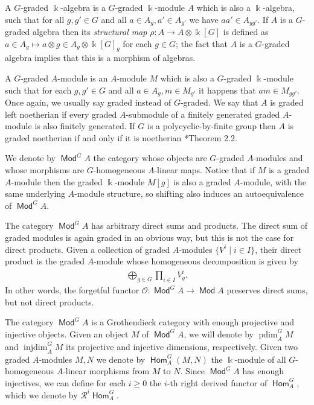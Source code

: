 \documentclass[11pt,fleqn]{article}
\newcommand\ot{\otimes}
\renewcommand\to{\longrightarrow}
\renewcommand\k{\Bbbk}
\renewcommand\O{\mathcal O}
\newcommand\R{\mathcal R}
\DeclareMathOperator\Mod{\mathsf{Mod}}
\DeclareMathOperator\Hom{\mathsf{Hom}}
\DeclareMathOperator\injdim{injdim}
\DeclareMathOperator\projdim{pdim}
\begin{document}
A $G$-graded $\k$-algebra is a $G$-graded $\k$-module $A$ which is also a 
$\k$-algebra, such that for all $g,g' \in G$ and all $a \in A_g, a' \in A_{g'}$
we have $aa' \in A_{gg'}$. If $A$ is a $G$-graded algebra then its
\emph{structural map} $\rho: A \to A \ot \k[G]$ is defined as $a \in A_g 
\mapsto a \ot g \in A_g \ot \k[G]_g$ for each $g \in G$; the fact that $A$ is 
a $G$-graded algebra implies that this is a morphism of algebras.

A $G$-graded $A$-module is an $A$-module $M$ which is also a $G$-graded 
$\k$-module such that for each $g,g' \in G$ and all $a \in A_g, 
m \in M_{g'}$ it happens that $am \in M_{gg'}$. Once again, we usually say 
graded instead of $G$-graded. We say that $A$ is graded left noetherian if
every graded $A$-submodule of a finitely generated graded $A$-module is
also finitely generated. If $G$ is a polycyclic-by-finite group then $A$ is
graded noetherian if and only if it is noetherian 
\cite{CQ-polycyclic}*{Theorem 2.2}.

We denote by $\Mod^G A$ the category whose objects are $G$-graded
$A$-modules and whose morphisms are $G$-homogeneous $A$-linear maps. 
Notice that if $M$ is a graded $A$-module then the graded $\k$-module $M[g]$
is also a graded $A$-module, with the same underlying $A$-module structure,
so shifting also induces an autoequivalence of $\Mod^G A$. 

The category $\Mod^G A$ has arbitrary direct sums and products. The direct sum
of graded modules is again graded in an obvious way, but this is not the case
for direct products. Given a collection of graded $A$-modules $\{V^i \mid i 
\in I\}$, their direct product is the graded $A$-module whose homogeneous 
decomposition is given by
\begin{align*}
\bigoplus_{g \in G} \prod_{i \in I} V^i_g.
\end{align*}
In other words, the forgetful functor $\O: \Mod^G A \to \Mod A$ preserves
direct sums, but not direct products.

The category $\Mod^G A$ is a Grothendieck category with enough projective and 
injective objects. Given an object $M$ of $\Mod^G A$, we will denote by 
$\projdim_A^G M$ and $\injdim_A^G M$ its projective and injective dimensions, 
respectively. Given two graded $A$-modules $M, N$ we denote by $\Hom^G_A(M,N)$ 
the $\k$-module of all $G$-homogeneous $A$-linear morphisms from $M$ to $N$. 
Since $\Mod^G A$ has enough injectives, we can define for each $i \geq 0$ the 
$i$-th right derived functor of $\Hom^G_A$, which we denote by $\R^i\Hom^G_A$. 
\end{document}
